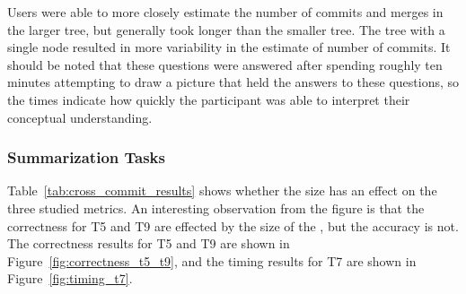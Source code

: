 Users were able to more closely estimate the number of commits and
merges in the larger tree, but generally took longer than the smaller
tree. The tree with a single node resulted in more variability in the
estimate of number of commits. It should be noted that these questions
were answered after spending roughly ten minutes attempting to draw a
picture that held the answers to these questions, so the times indicate
how quickly the participant was able to interpret their conceptual
understanding.

\subsubsection{Summarization Tasks}
\label{sub:summarization_tasks}

Table~\ref{tab:cross_commit_results} shows whether the \mt size
has an effect on the three studied metrics. An interesting observation
from the figure is that the correctness for T5 and T9 are effected by
the size of the \mt, but the accuracy is not. The correctness
results for T5 and T9 are shown in Figure~\ref{fig:correctness_t5_t9},
and the timing results for T7 are shown in Figure~\ref{fig:timing_t7}.

